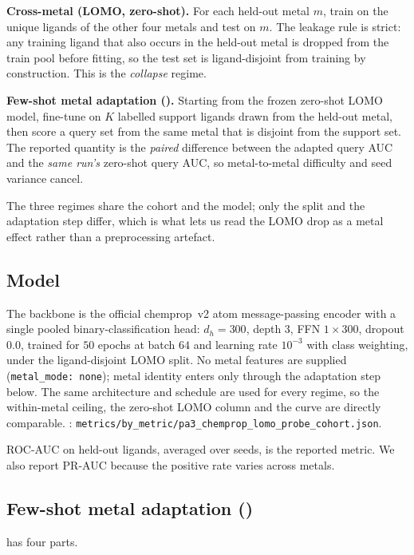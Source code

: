 \textbf{Cross-metal (LOMO, zero-shot).} For each held-out metal $m$, train on
the unique ligands of the other four metals and test on $m$. The leakage rule is
strict: any training ligand that also occurs in the held-out metal is dropped
from the train pool before fitting, so the test set is ligand-disjoint from
training by construction. This is the \emph{collapse} regime.

\textbf{Few-shot metal adaptation (\fsma).} Starting from the frozen zero-shot
LOMO model, fine-tune on $K$ labelled support ligands drawn from the held-out
metal, then score a query set from the same metal that is disjoint from the
support set. The reported quantity is the \emph{paired} difference between the
adapted query AUC and the \emph{same run's} zero-shot query AUC, so
metal-to-metal difficulty and seed variance cancel.

The three regimes share the cohort and the model; only the split and the
adaptation step differ, which is what lets us read the LOMO drop as a metal
effect rather than a preprocessing artefact.

\subsection{Model}
\label{sec:method:models}

The backbone is the official chemprop~v2 atom message-passing encoder
\citep{chemprop, dmpnn2019} with a single pooled binary-classification head:
$d_h=300$, depth $3$, FFN $1\times300$, dropout $0.0$, trained for $50$ epochs
at batch $64$ and learning rate $10^{-3}$ with class weighting, under the
ligand-disjoint LOMO split. No metal features are supplied
(\texttt{metal\_mode: none}); metal identity enters only through the adaptation
step below. The same architecture and schedule are used for every regime, so the
within-metal ceiling, the zero-shot LOMO column and the \fsma{} curve are
directly comparable. \MEASURED:
\texttt{metrics/by\_metric/pa3\_chemprop\_lomo\_probe\_cohort.json}.

ROC-AUC on held-out ligands, averaged over seeds, is the reported metric. We
also report PR-AUC because the positive rate varies across metals.

\subsection{Few-shot metal adaptation (\fsma)}
\label{sec:method:method}

\fsma{} has four parts.

